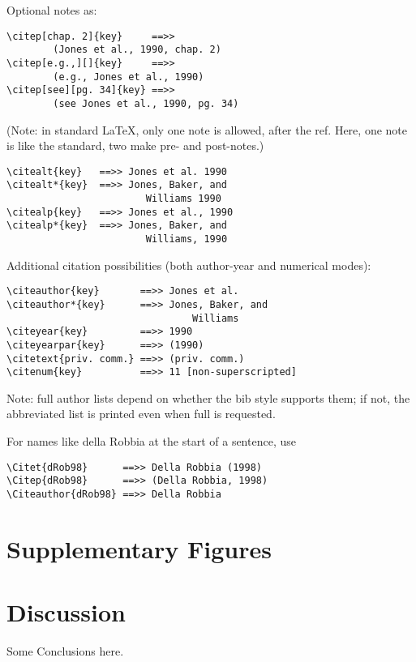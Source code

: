 \documentclass[unnumsec,webpdf,contemporary,large]{oup-authoring-template}%
\theoremstyle{thmstyleone}%
\theoremstyle{thmstyletwo}%
\theoremstyle{thmstylethree}%
\begin{document}
\noindent
Optional notes as:


{%
\begin{verbatim}
\citep[chap. 2]{key}     ==>>
        (Jones et al., 1990, chap. 2)
\citep[e.g.,][]{key}     ==>>
        (e.g., Jones et al., 1990)
\citep[see][pg. 34]{key} ==>>
        (see Jones et al., 1990, pg. 34)
\end{verbatim}}


\noindent
(Note: in standard LaTeX, only one note is allowed, after the ref.
Here, one note is like the standard, two make pre- and post-notes.)


{%
\begin{verbatim}
\citealt{key}   ==>> Jones et al. 1990
\citealt*{key}  ==>> Jones, Baker, and
                        Williams 1990
\citealp{key}   ==>> Jones et al., 1990
\citealp*{key}  ==>> Jones, Baker, and
                        Williams, 1990
\end{verbatim}}


\noindent
Additional citation possibilities (both author-year and numerical modes):


{%
\begin{verbatim}
\citeauthor{key}       ==>> Jones et al.
\citeauthor*{key}      ==>> Jones, Baker, and
                                Williams
\citeyear{key}         ==>> 1990
\citeyearpar{key}      ==>> (1990)
\citetext{priv. comm.} ==>> (priv. comm.)
\citenum{key}          ==>> 11 [non-superscripted]
\end{verbatim}}


\noindent
Note: full author lists depend on whether the bib style supports them;
if not, the abbreviated list is printed even when full is requested.

\noindent
For names like della Robbia at the start of a sentence, use


{%
\begin{verbatim}
\Citet{dRob98}      ==>> Della Robbia (1998)
\Citep{dRob98}      ==>> (Della Robbia, 1998)
\Citeauthor{dRob98} ==>> Della Robbia
\end{verbatim}}

\section{Supplementary Figures}



\section{Discussion}

Some Conclusions here.





\end{document}
